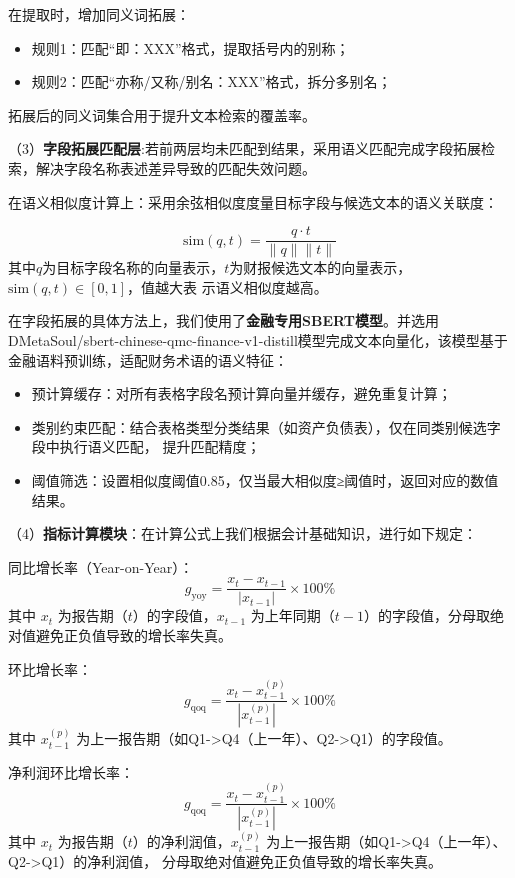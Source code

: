 \documentclass[withoutpreface,bwprint]{cumcmthesis} %
\begin{document}
在提取时，增加同义词拓展：

\begin{itemize}[leftmargin=*]
	\item 规则1：匹配``即：XXX''格式，提取括号内的别称；
	\item 规则2：匹配``亦称/又称/别名：XXX''格式，拆分多别名；
\end{itemize}
拓展后的同义词集合用于提升文本检索的覆盖率。

（3）\textbf{字段拓展匹配层}:若前两层均未匹配到结果，采用语义匹配完成字段拓展检索，解决字段名称表述差异导致的匹配失效问题。

在语义相似度计算上：采用余弦相似度度量目标字段与候选文本的语义关联度：

\[
	\text{sim}(q,t)=\frac{q\cdot t}{\|q\|\|t\|}
\]
其中$q$为目标字段名称的向量表示，$t$为财报候选文本的向量表示，$\text{sim}(q,t)\in[0,1]$，值越大表
示语义相似度越高。

在字段拓展的具体方法上，我们使用了\textbf{金融专用SBERT模型}。并选用DMetaSoul/sbert-chinese-qmc-finance-v1-distill模型完成文本向量化，该模型基于金融语料预训练，适配财务术语的语义特征：

\begin{itemize}[leftmargin=*]
	\item 预计算缓存：对所有表格字段名预计算向量并缓存，避免重复计算；
	\item 类别约束匹配：结合表格类型分类结果（如资产负债表），仅在同类别候选字段中执行语义匹配，
	      提升匹配精度；
	\item 阈值筛选：设置相似度阈值0.85，仅当最大相似度≥阈值时，返回对应的数值结果。
\end{itemize}

（4）\textbf{指标计算模块}：在计算公式上我们根据会计基础知识，进行如下规定：

同比增长率（Year-on-Year）：
\[
	g_{\text{yoy}} = \frac{x_t - x_{t-1}}{|x_{t-1}|} \times 100\%
\]
其中 $x_t$ 为报告期（$t$）的字段值，$x_{t-1}$ 为上年同期（$t-1$）的字段值，分母取绝对值避免正负值导致的增长率失真。

环比增长率：
\[
	g_{\text{qoq}} = \frac{x_t - x_{t-1}^{(p)}}{|x_{t-1}^{(p)}|} \times 100\%
\]
其中 $x_{t-1}^{(p)}$ 为上一报告期（如Q1->Q4（上一年）、Q2->Q1）的字段值。

净利润环比增长率：
\[
	g_{\text{qoq}} = \frac{x_t - x_{t-1}^{(p)}}{|x_{t-1}^{(p)}|} \times 100\%
\]
其中 $x_t$ 为报告期（$t$）的净利润值，$x_{t-1}^{(p)}$ 为上一报告期（如Q1->Q4（上一年）、Q2->Q1）的净利润值，
分母取绝对值避免正负值导致的增长率失真。
\end{document}
